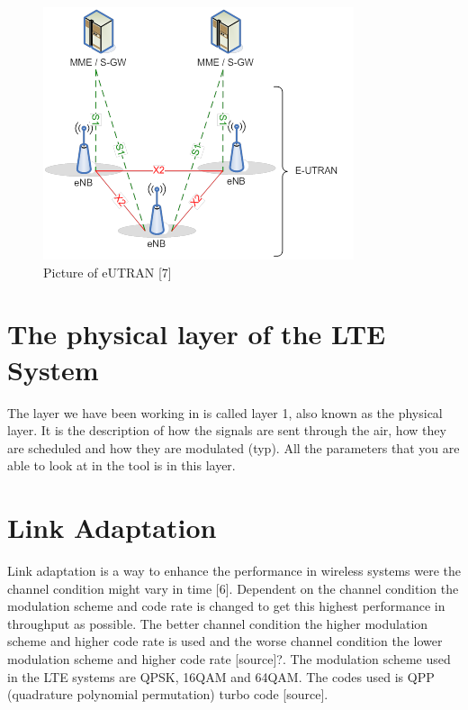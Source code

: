 \documentclass[cropmarks, frame, english]{idamasterthesis}
\begin{document}
\begin{figure}[H]
\includegraphics[width=\textwidth]{eUtran_[36300-c20]}
\centering
\caption{Picture of eUTRAN [7]}
\end{figure}






\section{The physical layer of the LTE System}
The layer we have been working in is called layer 1, also known as the physical layer. It is the description of how the signals are sent through the air, how they are scheduled and how they are modulated (typ). All the parameters that you are able to look at in the tool is in this layer.


\section{Link Adaptation}
Link adaptation is a way to enhance the performance in wireless systems were the channel condition might vary in time [6]. Dependent on the channel condition the modulation scheme and code rate is changed to get this highest performance in throughput as possible. The better channel condition the higher modulation scheme and higher code rate is used and the worse channel condition the lower modulation scheme and higher code rate [source]?. The modulation scheme used in the LTE systems are QPSK, 16QAM and 64QAM. The codes used is QPP (quadrature polynomial permutation) turbo code [source].
\end{document}
